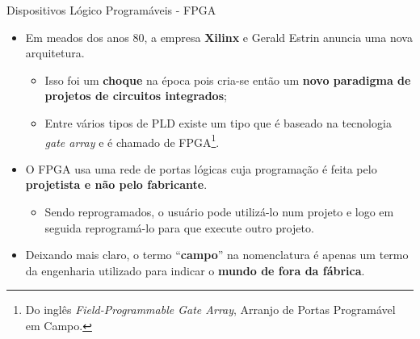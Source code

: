 \documentclass[aspectratio=169]{beamer}
\begin{document}
	\begin{frame}{Dispositivos Lógico Programáveis - FPGA}
		\begin{itemize}			
			\setlength\itemsep{0.6em}
			
			\item Em meados dos anos 80, a empresa \textbf{Xilinx} e Gerald Estrin anuncia uma nova arquitetura.
			
			\begin{itemize}
				\item Isso foi um \textbf{choque} na época pois cria-se então um \textbf{novo paradigma de projetos de circuitos integrados};
				
				\item Entre vários tipos de PLD existe um tipo que é baseado na tecnologia \textit{gate array} e é chamado de FPGA\footnote{Do inglês \textit{Field-Programmable Gate Array}, Arranjo de Portas Programável em Campo.}.
			\end{itemize}
			
			
			\item O FPGA usa uma rede de portas lógicas cuja programação é feita pelo \textbf{projetista e não pelo fabricante}. 
			\begin{itemize}
				\item Sendo reprogramados, o usuário pode utilizá-lo num projeto e logo em seguida reprogramá-lo para que execute outro projeto.
			\end{itemize}
			
			\item Deixando mais claro, o termo ``\textbf{campo}'' na nomenclatura é apenas um termo da engenharia utilizado para indicar o \textbf{mundo de fora da fábrica}.
		\end{itemize}
	\end{frame}
	
\end{document}
